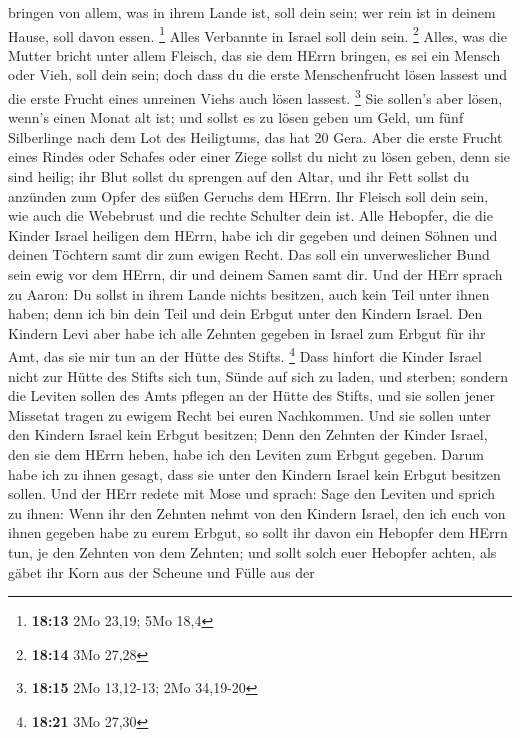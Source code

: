 bringen von allem, was in ihrem Lande ist, soll dein sein; wer rein ist
in deinem Hause, soll davon essen. \footnote{\textbf{18:13} 2Mo 23,19;
  5Mo 18,4}  Alles Verbannte in Israel soll dein sein.
\footnote{\textbf{18:14} 3Mo 27,28}  Alles, was die
Mutter bricht unter allem Fleisch, das sie dem HErrn bringen, es sei ein
Mensch oder Vieh, soll dein sein; doch dass du die erste Menschenfrucht
lösen lassest und die erste Frucht eines unreinen Viehs auch lösen
lassest. \footnote{\textbf{18:15} 2Mo 13,12-13; 2Mo 34,19-20}
 Sie sollen's aber lösen, wenn's einen Monat alt ist; und
sollst es zu lösen geben um Geld, um fünf Silberlinge nach dem Lot des
Heiligtums, das hat 20 Gera.  Aber die erste Frucht eines
Rindes oder Schafes oder einer Ziege sollst du nicht zu lösen geben,
denn sie sind heilig; ihr Blut sollst du sprengen auf den Altar, und ihr
Fett sollst du anzünden zum Opfer des süßen Geruchs dem HErrn.
 Ihr Fleisch soll dein sein, wie auch die Webebrust und
die rechte Schulter dein ist.  Alle Hebopfer, die die
Kinder Israel heiligen dem HErrn, habe ich dir gegeben und deinen Söhnen
und deinen Töchtern samt dir zum ewigen Recht. Das soll ein
unverweslicher Bund sein ewig vor dem HErrn, dir und deinem Samen samt
dir.  Und der HErr sprach zu Aaron: Du sollst in ihrem
Lande nichts besitzen, auch kein Teil unter ihnen haben; denn ich bin
dein Teil und dein Erbgut unter den Kindern Israel.  Den
Kindern Levi aber habe ich alle Zehnten gegeben in Israel zum Erbgut für
ihr Amt, das sie mir tun an der Hütte des Stifts. \footnote{\textbf{18:21}
  3Mo 27,30}  Dass hinfort die Kinder Israel nicht zur
Hütte des Stifts sich tun, Sünde auf sich zu laden, und sterben;
 sondern die Leviten sollen des Amts pflegen an der Hütte
des Stifts, und sie sollen jener Missetat tragen zu ewigem Recht bei
euren Nachkommen. Und sie sollen unter den Kindern Israel kein Erbgut
besitzen;  Denn den Zehnten der Kinder Israel, den sie
dem HErrn heben, habe ich den Leviten zum Erbgut gegeben. Darum habe ich
zu ihnen gesagt, dass sie unter den Kindern Israel kein Erbgut besitzen
sollen.  Und der HErr redete mit Mose und sprach:
 Sage den Leviten und sprich zu ihnen: Wenn ihr den
Zehnten nehmt von den Kindern Israel, den ich euch von ihnen gegeben
habe zu eurem Erbgut, so sollt ihr davon ein Hebopfer dem HErrn tun, je
den Zehnten von dem Zehnten;  und sollt solch euer
Hebopfer achten, als gäbet ihr Korn aus der Scheune und Fülle aus der
